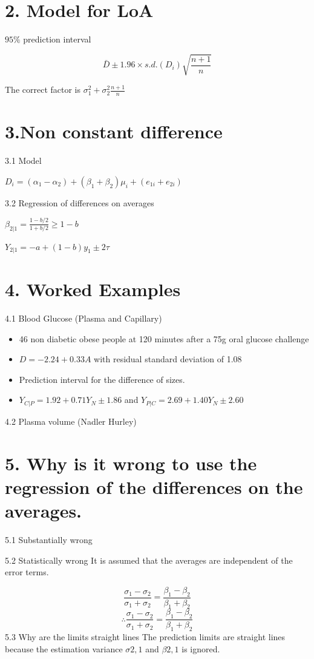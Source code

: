 \documentclass[12pt, a4paper]{report}
\theoremstyle{plain}
\theoremstyle{definition}
\theoremstyle{remark}
\begin{document}
\section{2. Model for LoA}

$95\%$ prediction interval

\[ \bar{D} \pm 1.96 \times s.d.(D_i) \sqrt{\frac{n+1}{n}} \]

The correct factor is $\sigma^2_1 + \sigma^2_2 \frac{n+1}{n}$

\section{3.Non constant difference}

3.1 Model

$D_i = (\alpha_1 - \alpha_2) + (\beta_1 + \beta_2)\mu_i +(e_{1i} + e_{2i})$

3.2 Regression of differences on averages

$\beta_{2|1} = \frac{1-b/2}{1+b/2} \geq 1-b $

$Y_{2|1} = -a +(1-b)y_1  \pm 2 \tau $

\section{4. Worked Examples}
4.1 Blood Glucose (Plasma and Capillary)

\begin{itemize}
	\item 46 non diabetic obese people at 120 minutes after a 75g oral glucose challenge
	\item $D = -2.24 + 0.33A$ with residual standard deviation of 1.08
	\item Prediction  interval for the difference of sizes.
	\item $Y_{C|P}  = 1.92 + 0.71Y_N \pm 1.86$ and $Y_{P|C}  =2.69 +1.40Y_N \pm 2.60$
\end{itemize}
4.2 Plasma volume (Nadler Hurley)

\section{5. Why is it wrong to use the regression of the differences on the averages.}

5.1 Substantially wrong

5.2 Statistically wrong
It is assumed that the averages are independent of the error terms.

\[
\frac{\sigma_1 - \sigma_2}
{\sigma_1 + \sigma_2}
=
\frac{\beta_1 - \beta_2}
{\beta_1 + \beta_2}
\] 
\[ \therefore  \frac{\sigma_1 - \sigma_2}
{\sigma_1 + \sigma_2}
=
\frac{\beta_1 - \beta_2}
{\beta_1 + \beta_2}
\]
5.3 Why are the limits straight lines
The prediction limits are straight lines because the estimation variance $\sigma2,1$ and $\beta2,1$ is ignored.
\end{document}

